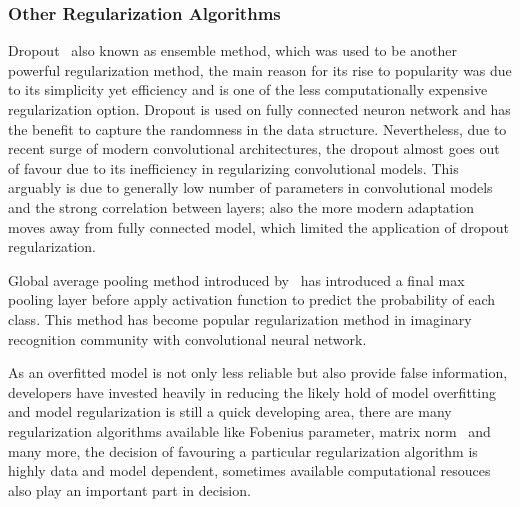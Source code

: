 \subsubsection{Other Regularization Algorithms}

Dropout~\cite{JMLR:v15:srivastava14a} also known as ensemble method, which was used to be another powerful regularization method, the main reason for its rise to popularity was due to its simplicity yet efficiency and is one of the less computationally expensive regularization option. Dropout is used on fully connected neuron network and has the benefit to capture the randomness in the data structure. Nevertheless, due to recent surge of modern convolutional architectures, the dropout almost goes out of favour due to its inefficiency in regularizing convolutional models. This arguably is due to generally low number of parameters in convolutional models and the strong correlation between layers; also the more modern adaptation moves away from fully connected model, which limited the application of dropout regularization. 
\par 
Global average pooling method introduced by~\citet{LinCY13} has introduced a final max pooling layer before apply activation function to predict the probability of each class. This method has become popular regularization method in imaginary recognition community with convolutional neural network. 
\par 
As an overfitted model is not only less reliable but also provide false information, developers have invested heavily in reducing the likely hold of model overfitting and model regularization is still a quick developing area, there are many regularization algorithms available like Fobenius parameter\cite{Yu20021,Huang20111804Ding:2006}, matrix norm~\cite{Abernethy2009803,Obozinski_2009,Argyriou_2008,Li:2018} and many more, the decision of favouring a particular regularization algorithm is highly data and model dependent, sometimes available computational resouces also play an important part in decision.  